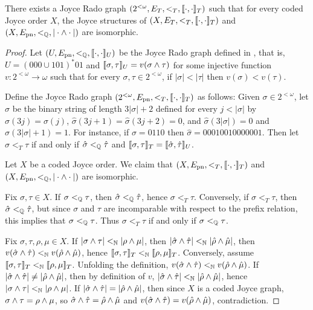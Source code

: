 \begin{theorem}[$\RCA_0$]\label{thm:joyce-diagonalization-Rado}
There exists a Joyce Rado graph $(2^{<\omega}, E_T, <_T, \llbracket \cdot , \cdot \rrbracket_T)$
such that for every coded Joyce order $X$,
the Joyce structures of $(X, E_T, <_T, \llbracket \cdot , \cdot \rrbracket_T)$ and $(X, E_{\mathrm{pn}}, <_{\mathbb{Q}}, |\cdot \wedge \cdot|)$ are isomorphic.
\end{theorem}
\begin{proof}
Let $(U, E_{\mathrm{pn}}, <_{\mathbb{Q}}, \llbracket \cdot , \cdot \rrbracket_U)$ be the Joyce Rado graph defined in , that is, $U = (000 \cup 101)^{*}01$ and $\llbracket \sigma , \tau \rrbracket_U = v(\sigma \wedge \tau)$ for some injective function $v: 2^{<\omega} \to \omega$ such that 
for every $\sigma, \tau \in 2^{<\omega}$, if $|\sigma| < |\tau|$ then $v(\sigma) < v(\tau)$.

Define the Joyce Rado graph $(2^{<\omega}, E_{\mathrm{pn}}, <_T,  \llbracket \cdot , \cdot \rrbracket_T)$ as follows:
Given $\sigma \in 2^{<\omega}$, let $\hat{\sigma}$ be the binary string of length $3|\sigma|+2$
defined for every $j < |\sigma|$ by $\hat{\sigma}(3j) = \sigma(j)$, $\hat{\sigma}(3j+1) = \hat{\sigma}(3j+2) = 0$, and $\hat{\sigma}(3|\sigma|) = 0$ and $\hat{\sigma}(3|\sigma|+1) = 1$.
For instance, if $\sigma = 0110$ then $\hat{\sigma} = 00010010000001$.
Then let $\sigma <_T \tau$ if and only if $\hat{\sigma} <_{\mathbb{Q}} \hat{\tau}$
and $\llbracket \sigma , \tau \rrbracket_T = \llbracket \hat{\sigma} , \hat{\tau} \rrbracket_U$. 

Let $X$ be a coded Joyce order. We claim that $(X, E_{\mathrm{pn}}, <_T, \llbracket \cdot , \cdot \rrbracket_T)$ and $(X, E_{\mathrm{pn}}, <_{\mathbb{Q}}, |\cdot \wedge \cdot|)$ are isomorphic.

Fix $\sigma, \tau \in X$. If $\sigma <_{\mathbb{Q}} \tau$, then $\hat{\sigma} <_{\mathbb{Q}} \hat{\tau}$, hence $\sigma <_T \tau$. Conversely, if $\sigma <_T \tau$, then $\hat{\sigma} <_{\mathbb{Q}} \hat{\tau}$, but since $\sigma$ and $\tau$ are incomparable with respect to the prefix relation, this implies that $\sigma <_{\mathbb{Q}} \tau$. Thus $\sigma <_T \tau$ if and only if $\sigma <_{\mathbb{Q}} \tau$.

Fix $\sigma, \tau, \rho, \mu \in X$. If $|\sigma \wedge \tau| <_{\mathbb{N}} |\rho \wedge \mu|$, then 
$|\hat{\sigma} \wedge \hat{\tau}| <_{\mathbb{N}} |\hat{\rho} \wedge \hat{\mu}|$, then $v(\hat{\sigma} \wedge \hat{\tau}) <_{\mathbb{N}} v(\hat{\rho} \wedge \hat{\mu})$, hence $\llbracket \sigma , \tau \rrbracket_T <_{\mathbb{N}} \llbracket \rho , \mu \rrbracket_T$. Conversely, assume $\llbracket \sigma , \tau \rrbracket_T <_{\mathbb{N}} \llbracket \rho , \mu \rrbracket_T$. Unfolding the definition, $v(\hat{\sigma} \wedge \hat{\tau}) <_{\mathbb{N}} v(\hat{\rho} \wedge \hat{\mu})$. If $|\hat{\sigma} \wedge \hat{\tau}| \neq |\hat{\rho} \wedge \hat{\mu}|$, then by definition of $v$, $|\hat{\sigma} \wedge \hat{\tau}| <_{\mathbb{N}} |\hat{\rho} \wedge \hat{\mu}|$, hence $|\sigma \wedge \tau| <_{\mathbb{N}} |\rho \wedge \mu|$. If $|\hat{\sigma} \wedge \hat{\tau}| = |\hat{\rho} \wedge \hat{\mu}|$, then since $X$ is a coded Joyce graph, $\sigma \wedge \tau = \rho \wedge \mu$, so $\hat{\sigma} \wedge \hat{\tau} = \hat{\rho} \wedge \hat{\mu}$ and $v(\hat{\sigma} \wedge \hat{\tau}) = v(\hat{\rho} \wedge \hat{\mu})$, contradiction. 
\end{proof}

